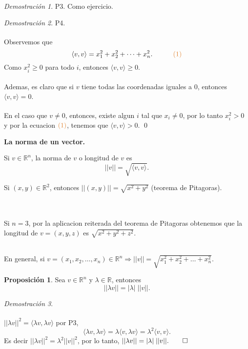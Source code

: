 \documentclass{article}
\theoremstyle{definition}
\theoremstyle{definition}
\newtheorem{prop}[teo]{Proposición}
\theoremstyle{remark}
\newtheorem*{demo}{Demostración}
\begin{document}
\begin{demo}
\textcolor{rojop2}{P3.} Como ejercicio.
\end{demo}
\begin{demo}
  \textcolor{rojop2}{P4.} \\\\
  Observemos que \[
    \langle v,v \rangle = x^2_1+x^2_2+\cdots + x^2_n. \quad \quad \quad \textcolor{rojop2}{(1)}
  \]
  Como $x^2_i \geq 0$ para todo $i$, entonces $\langle v,v \rangle \geq 0$. \\\\ Ademas, es claro que si $v$ tiene todas las coordenadas iguales a $0$, entonces $\langle v,v \rangle = 0$. \\\\ En el caso que $v \neq 0$, entonces, existe algun $i$ tal que $x_i \neq 0$, por lo tanto $x^2_i>0$ y por la ecuacion $\textcolor{rojop2}{(1)}$, tenemos que $\langle v,v \rangle > 0$. \qed
\end{demo}
\begin{center}
\textbf{La norma de un vector.}
\end{center}
\begin{defi}
  Si $v \in \mathbb{R}^n$, la norma de $v$ o longitud de $v$ es \[
    ||v||=\sqrt{\langle v,v \rangle}.
  \]
\end{defi}
Si $(x,y) \in \mathbb{R}^2$, entonces $||(x,y)||=\sqrt{x^2+y^2}$ (teorema de Pitagoras).
\begin{figure}[h]
\centering
\def\svgwidth{0.35\textwidth}

\end{figure}
\\ \pagebreak \\
Si $n=3$, por la aplicacion reiterada del teorema de Pitagoras obtenemos que la longitud de $v=(x,y,z)$ es $\sqrt{x^2+y^2+z^2}$.
\begin{figure}[h]
\centering
\def\svgwidth{0.35\textwidth}

\end{figure}
\\
En general, si $v=(x_1,x_2,\dots,x_n) \in \mathbb{R}^n \Rightarrow ||v|| = \sqrt{x^2_1+x^2_2+\dots+x^2_n}$.
\begin{prop}
  Sea $v \in \mathbb{R}^n$ y $\lambda \in \mathbb{R}$, entonces \[
||\lambda v || = |\lambda| \; ||v||.
  \]
\end{prop}
\begin{demo} \;\\\\
  $||\lambda v||^2=\langle \lambda v,\lambda v \rangle$ por \textcolor{azulp2}{P3},\[
\langle \lambda v,\lambda v \rangle =\lambda \langle v , \lambda v \rangle = \lambda^2 \langle v , v \rangle.
  \] Es decir $||\lambda v ||^2 =\lambda^2 ||v||^2$, por lo tanto, $||\lambda v || = |\lambda| \; ||v||. \qed$
\end{demo}
\end{document}
